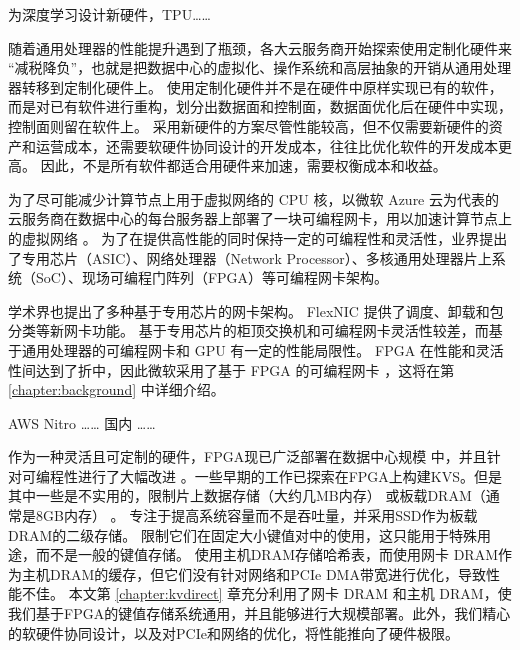 为深度学习设计新硬件，TPU……

随着通用处理器的性能提升遇到了瓶颈，各大云服务商开始探索使用定制化硬件来 ``减税降负''，也就是把数据中心的虚拟化、操作系统和高层抽象的开销从通用处理器转移到定制化硬件上。
使用定制化硬件并不是在硬件中原样实现已有的软件，而是对已有软件进行重构，划分出数据面和控制面，数据面优化后在硬件中实现，控制面则留在软件上。
采用新硬件的方案尽管性能较高，但不仅需要新硬件的资产和运营成本，还需要软硬件协同设计的开发成本，往往比优化软件的开发成本更高。
因此，不是所有软件都适合用硬件来加速，需要权衡成本和收益。

为了尽可能减少计算节点上用于虚拟网络的 CPU 核，以微软 Azure 云为代表的云服务商在数据中心的每台服务器上部署了一块可编程网卡，用以加速计算节点上的虚拟网络 \cite{smartnic}。
为了在提供高性能的同时保持一定的可编程性和灵活性，业界提出了专用芯片（ASIC）、网络处理器（Network Processor）、多核通用处理器片上系统（SoC）、现场可编程门阵列（FPGA）等可编程网卡架构。

学术界也提出了多种基于专用芯片的网卡架构。
FlexNIC \cite{kaufmann2016high} 提供了调度、卸载和包分类等新网卡功能。
基于专用芯片的柜顶交换机和可编程网卡灵活性较差，而基于通用处理器的可编程网卡和 GPU 有一定的性能局限性。
FPGA 在性能和灵活性间达到了折中，因此微软采用了基于 FPGA 的可编程网卡 \cite{putnam2014reconfigurable}，这将在第 \ref{chapter:background} 中详细介绍。

AWS Nitro …… 国内 ……








作为一种灵活且可定制的硬件，FPGA现已广泛部署在数据中心规模 \cite {putnam2014reconfigurable,caulfield2016cloud}中，并且针对可编程性进行了大幅改进 \cite {bacon2013fpga,li2016clicknp}。一些早期的工作已探索在FPGA上构建KVS。但是其中一些是不实用的，限制片上数据存储（大约几MB内存） \cite {liang16fpl}或板载DRAM（通常是8GB内存） \cite {istvan2013flexible,chalamalasetti2013fpga,istvan2015hash}。
\cite {blott2015scaling}专注于提高系统容量而不是吞吐量，并采用SSD作为板载DRAM的二级存储。
\cite {liang16fpl,chalamalasetti2013fpga}限制它们在固定大小键值对中的使用，这只能用于特殊用途，而不是一般的键值存储。
\cite {blott13hotcloud,lavasani2014fpga}使用主机DRAM存储哈希表，而\cite {tokusashi2016multilevel}使用网卡 DRAM作为主机DRAM的缓存，但它们没有针对网络和PCIe DMA带宽进行优化，导致性能不佳。
本文第 \ref{chapter:kvdirect} 章充分利用了网卡 DRAM 和主机 DRAM，使我们基于FPGA的键值存储系统通用，并且能够进行大规模部署。此外，我们精心的软硬件协同设计，以及对PCIe和网络的优化，将性能推向了硬件极限。



